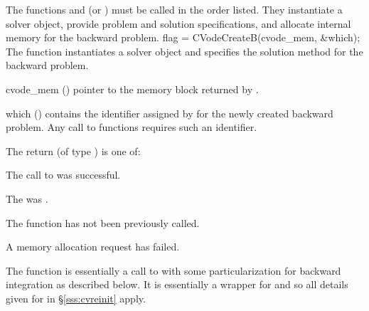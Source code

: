 The functions  and  (or ) must be 
called in the order listed. They instantiate a {\cvodes} solver object, provide problem 
and solution specifications, and allocate internal memory for the backward problem.
{
  flag = CVodeCreateB(cvode\_mem, \&which);
}
{
  The function  instantiates a {\cvodes} solver object and specifies 
  the solution method for the backward problem.
}
{
  \begin{args}
  \item[cvode\_mem] ()
    pointer to the {\cvodes} memory block returned by .
  \item[which] ()
    contains the identifier assigned by {\cvodes} for the newly created backward 
    problem. Any call to  functions requires such an identifier.
  \end{args}
}
{
   The return  (of type ) is one of:
   \begin{args}
   \item[\Id{CV\_SUCCESS}]
     The call to  was successful.
   \item[\Id{CV\_MEM\_NULL}]
     The  was .
   \item[\Id{CV\_NO\_ADJ}]
     The function  has not been previously called.
   \item[\Id{CV\_MEM\_FAIL}]
     A memory allocation request has failed.
   \end{args}
}
{}
The function  is essentially a call to  with some 
particularization for backward integration as described below. It is essentially 
a wrapper for  and so all details given for  in 
\S\ref{sss:cvreinit} apply.

